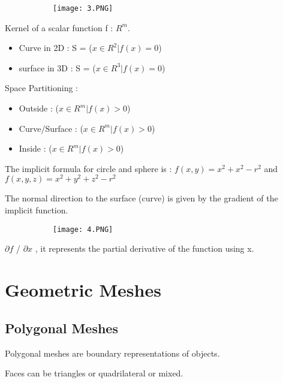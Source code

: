 \documentclass{article}
\begin{document}
\begin{figure}[ht!]
  \centering
  \begin{subfigure}[b]{0.3\linewidth}
    \texttt{[image: 3.PNG]}
  \end{subfigure}
\end{figure}

Kernel of a scalar function f : $R^m$.

\begin{itemize}
    \item Curve in 2D : S = ($x \in R^2 | f(x) = 0$)
    \item surface in 3D : S = (${x \in R^3 | f(x) = 0}$)
\end{itemize}

Space Partitioning :

\begin{itemize}
    \item Outside : ($x \in R^m | f(x) > 0$)
    \item Curve/Surface : ($x \in R^m | f(x) > 0$)
    \item Inside : ($x \in R^m | f(x) > 0$)
\end{itemize}

The implicit formula for circle and sphere is : $f(x,y) = x^2 + x^2 - r^2 $ and $f(x,y,z) = x^2 + y^2 + z^2 - r^2$

The normal direction to the surface (curve) is given by the gradient of the implicit function.

\begin{figure}[ht!]
  \centering
  \begin{subfigure}[b]{0.7\linewidth}
    \texttt{[image: 4.PNG]}
  \end{subfigure}
\end{figure}

$\partial f$ / $\partial x$ , it represents the partial derivative of the function using x.

\section{Geometric Meshes}

\subsection{Polygonal Meshes}

Polygonal meshes are boundary representations of objects.

Faces can  be triangles or quadrilateral or mixed.
\end{document}
